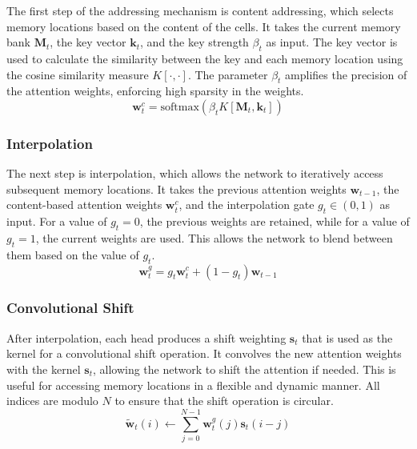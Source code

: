 \documentclass{article}
\begin{document}
The first step of the addressing mechanism is content addressing, which selects memory
locations based on the content of the cells. It takes the current memory bank
$\textbf{M}_t$, the key vector $\textbf{k}_t$, and the key strength $\beta_t$ as input.
The key vector is used to calculate the similarity between the key and each memory
location using the cosine similarity measure $K[\cdot, \cdot]$. The parameter $\beta_t$
amplifies the precision of the attention weights, enforcing high sparsity in the weights.
\begin{equation}
  \textbf{w}_t^c = \text{softmax}(\beta_t K[\textbf{M}_t, \textbf{k}_t])
\end{equation}


\subsubsection{Interpolation}
\label{sec:4.1.1}

The next step is interpolation, which allows the network to iteratively access subsequent
memory locations. It takes the previous attention weights $\textbf{w}_{t-1}$, the
content-based attention weights $\textbf{w}_t^c$, and the interpolation gate $g_t \in (0,
  1)$ as input. For a value of $g_t = 0$, the previous weights are retained, while for a
value of $g_t = 1$, the current weights are used. This allows the network to blend between
them based on the value of $g_t$.
\begin{equation}
  \textbf{w}_t^g = g_t \textbf{w}_t^c + (1 - g_t) \textbf{w}_{t-1}
\end{equation}


\subsubsection{Convolutional Shift}
\label{sec:4.1.2}

After interpolation, each head produces a shift weighting $\textbf{s}_t$ that is used as
the kernel for a convolutional shift operation. It convolves the new attention weights
with the kernel $\textbf{s}_t$, allowing the network to shift the attention if needed.
This is useful for accessing memory locations in a flexible and dynamic manner. All
indices are modulo $N$ to ensure that the shift operation is circular.
\begin{equation}
  \tilde{\textbf{w}}_t(i) \leftarrow \sum_{j=0}^{N-1} \textbf{w}_t^g(j) \textbf{s}_t(i-j)
\end{equation}
\end{document}
